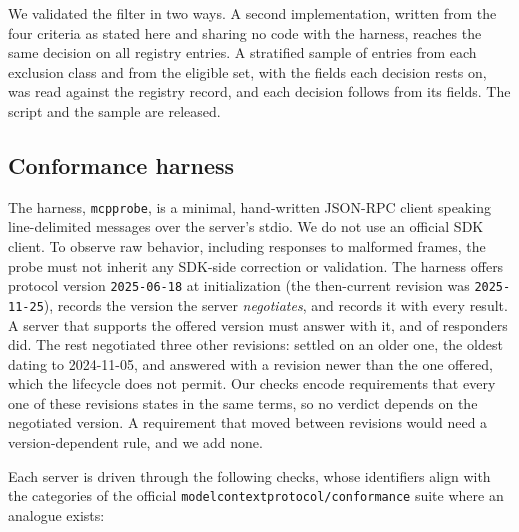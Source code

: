We validated the filter in two ways. A second implementation, written from the four
criteria as stated here and sharing no code with the harness, reaches the same
decision on all \Nframe{} registry entries. A stratified sample of entries from each
exclusion class and from the eligible set, with the fields each decision rests on, was
read against the registry record, and each decision follows from its fields. The
script and the sample are released.

\subsection{Conformance harness}
The harness, \texttt{mcpprobe}, is a minimal, hand-written JSON-RPC
client speaking line-delimited messages over the server's stdio. We do not
use an official SDK client. To observe raw behavior, including responses to
malformed frames, the probe must not inherit any SDK-side correction or
validation. The harness offers protocol version \texttt{2025-06-18} at
initialization (the then-current revision was \texttt{2025-11-25}), records the
version the server \emph{negotiates}, and records it with every result. A server that
supports the offered version must answer with it, and \NVerOffered{} of
\Nresponders{} responders did. The rest negotiated three other revisions:
\NVerDowngraded{} settled on an older one, the oldest dating to 2024-11-05, and
\NVerAhead{} answered with a revision newer than the one offered, which the
lifecycle does not permit. Our checks encode requirements that every one of these
revisions states in the same terms, so no verdict depends on the negotiated version.
A requirement that moved between revisions would need a version-dependent rule, and
we add none.

Each server is driven through the following checks, whose identifiers align with
the categories of the official \texttt{modelcontextprotocol/conformance} suite
where an analogue exists:

